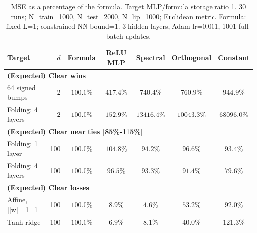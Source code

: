 \documentclass{article}
\begin{document}
\clearpage
\begin{table}[t]
\centering
\scriptsize
\setlength{\tabcolsep}{3pt}
\caption{MSE as a percentage of the formula. Target MLP/formula storage ratio 1. 30 runs; N\_train=1000, N\_test=2000, N\_lip=1000; Euclidean metric. Formula: fixed L=1; constrained NN bound=1. 3 hidden layers, Adam lr=0.001, 1001 full-batch updates.}
\begin{tabular}{lrccccc}
\hline
Target & $d$ & Formula & ReLU MLP & Spectral & Orthogonal & Constant \\
\hline
\multicolumn{7}{l}{\textbf{(Expected) Clear wins}} \\
64 signed bumps & 2 & $100.0\%$ & $417.4\%$ & $740.4\%$ & $760.9\%$ & $944.9\%$ \\
Folding: 4 layers & 2 & $100.0\%$ & $152.9\%$ & $13416.4\%$ & $10043.3\%$ & $68096.0\%$ \\
\hline
\multicolumn{7}{l}{\textbf{(Expected) Clear near ties [85\%-115\%]}} \\
Folding: 1 layer & 100 & $100.0\%$ & $104.8\%$ & $94.2\%$ & $96.6\%$ & $93.4\%$ \\
Folding: 4 layers & 100 & $100.0\%$ & $96.5\%$ & $93.3\%$ & $91.4\%$ & $79.6\%$ \\
\hline
\multicolumn{7}{l}{\textbf{(Expected) Clear losses}} \\
Affine, ||w||\_1=1 & 100 & $100.0\%$ & $8.9\%$ & $4.6\%$ & $53.2\%$ & $92.0\%$ \\
Tanh ridge & 100 & $100.0\%$ & $6.9\%$ & $8.1\%$ & $40.0\%$ & $121.3\%$ \\
\hline
\end{tabular}
\end{table}
\clearpage
\end{document}
